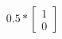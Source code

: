 \documentclass[preview]{standalone}
\begin{document}
\begin{align*}
0.5 * \begin{bmatrix} 1 \\ 0 \end{bmatrix}
\end{align*}
\end{document}
